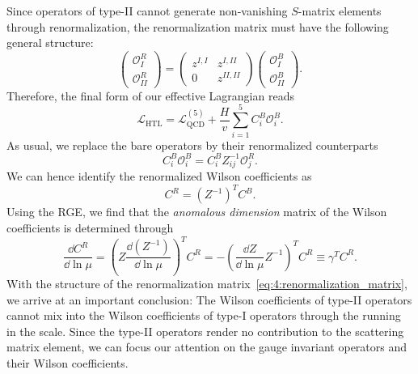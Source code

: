 Since operators of type-II cannot generate non-vanishing $S$-matrix elements through renormalization, the renormalization matrix must have the following general structure:
\begin{equation}
\begin{pmatrix}
\mathcal{O}_{I}^R \\
\mathcal{O}_{II}^R
\end{pmatrix} = \begin{pmatrix}
z^{I,I} & z^{I,II} \\
0 & z^{II,II}
\end{pmatrix} \begin{pmatrix}
\mathcal{O}_{I}^B \\
\mathcal{O}_{II}^B
\end{pmatrix}.
\label{eq:4:renormalization_matrix}
\end{equation}
Therefore, the final form of our effective Lagrangian reads
\begin{equation}
\mathcal{L}_{\text{HTL}} = \mathcal{L}_{\text{QCD}}^{(5)} + \frac{H}{v} \sum_{i=1}^5 C_i^B \mathcal{O}_i^B.
\label{eq:4:lagrangian_operator_basis}
\end{equation}
As usual, we replace the bare operators by their renormalized counterparts
\begin{equation}
C_i^B \mathcal{O}_i^B = C_i^B  Z_{ij}^{-1} \mathcal{O}_j^R.
\end{equation}
We can hence identify the renormalized Wilson coefficients as
\begin{equation}
C^R = (Z^{-1})^T C^B.
\end{equation}
Using the \acs{RGE}, we find that the \textit{anomalous dimension} matrix of the Wilson coefficients is determined through
\begin{equation}
\frac{\dd C^R}{\dd \ln \mu} = \left(Z \frac{\dd (Z^{-1})}{\dd \ln \mu} \right)^T  C^R = - \left( \frac{\dd Z}{\dd \ln \mu} Z^{-1} \right)^T C^R \equiv \gamma^T C^R .
\label{eq:4:anomalous_dimension_matrix}
\end{equation}
With the structure of the renormalization matrix~\eqref{eq:4:renormalization_matrix}, we arrive at an important conclusion: The Wilson coefficients of type-II operators cannot mix into the Wilson coefficients of type-I operators through the running in the scale. Since the type-II operators render no contribution to the scattering matrix element, we can focus our attention on the gauge invariant operators and their Wilson coefficients.

